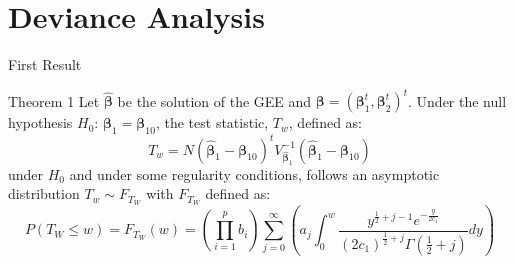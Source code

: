 \documentclass[t,9pt]{beamer}
\begin{document}
\section{Deviance Analysis}

\begin{frame}[fragile]{First Result}
 \begin{block}{Theorem 1}
Let $\hat{\pmb{ \beta}}$ be the solution of the GEE and $\pmb{\beta}= (\pmb{\beta}_1^t, \pmb{ \beta}_2^t)^t$. Under the null hypothesis $H_0:\,\pmb{\beta}_1=\pmb{\beta}_{10}$, the test statistic, $T_w$, defined as:
\begin{equation}\nonumber
T_w=N (\hat{ \pmb{ \beta}}_1- \pmb{ \beta}_{10})^t V_{\hat{ \pmb{ \beta}}_1}^{-1} (\hat{ \pmb{ \beta}}_1-\pmb{ \beta}_{10})
\end{equation}
under $H_0$ and under some regularity conditions, follows an asymptotic distribution  $T_w\sim F_{T_W} $ with $F_{T_W}$ defined as:
\begin{equation}\nonumber
P(T_W\leq w)=F_{T_W}(w)=\left(\prod_{i=1}^p b_i \right)\sum_{j=0}^\infty \left( a_j \int_0^w \frac{y^{\frac{1}{2}+j-1}e^{-\frac{y}{2c_1}}}{(2c_1)^{\frac{1}{2}+j}\Gamma(\frac{1}{2}+j)} dy \right)
\end{equation}
 \end{block} 
\end{frame}
\end{document}
